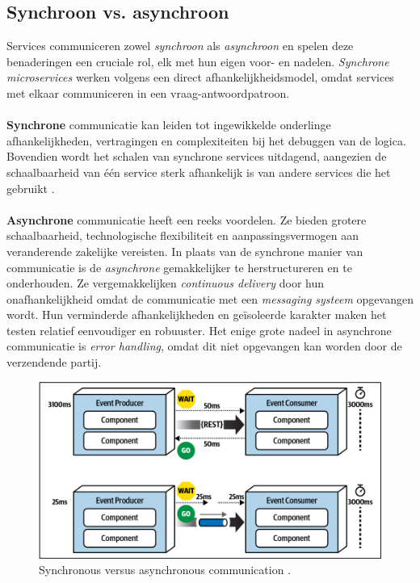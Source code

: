 \subsection{Synchroon vs. asynchroon}
Services communiceren zowel \emph{synchroon} als \emph{asynchroon} en spelen deze benaderingen een cruciale rol, 
elk met hun eigen voor- en nadelen. \emph{Synchrone microservices} werken volgens een direct 
afhankelijkheidsmodel, omdat services met elkaar communiceren in een vraag-antwoordpatroon. 
\\\\

\textbf{Synchrone} communicatie kan leiden tot ingewikkelde onderlinge afhankelijkheden, vertragingen en complexiteiten bij het debuggen 
van de logica. Bovendien wordt het schalen van synchrone services uitdagend, 
aangezien de schaalbaarheid van één service sterk afhankelijk is van andere services die het gebruikt \autocite{Bellemare2020}.  
\\\\

\textbf{Asynchrone} communicatie heeft een reeks voordelen. Ze bieden grotere schaalbaarheid, technologische 
flexibiliteit en aanpassingsvermogen aan veranderende zakelijke vereisten. 
In plaats van de synchrone manier van communicatie is de \emph{asynchrone} gemakkelijker te herstructureren en te onderhouden. 
Ze vergemakkelijken \emph{continuous delivery} door hun onafhankelijkheid omdat de communicatie 
met een \emph{messaging systeem} opgevangen wordt. 
Hun verminderde afhankelijkheden en geïsoleerde karakter maken het testen relatief eenvoudiger en robuuster.
Het enige grote nadeel in asynchrone communicatie is \emph{error handling}, 
omdat dit niet opgevangen kan worden door de verzendende partij.
\newline

\begin{figure}[h!]
  \centering
  \includegraphics[width=.5\textwidth]{../voorstel/img/synchronous_vs_async_calls.png}
  \caption{\label{fig:sync-vs-async}Synchronous versus asynchronous communication \autocite[figure 14 -- 13]{MarkRichards2021}.}
\end{figure}

